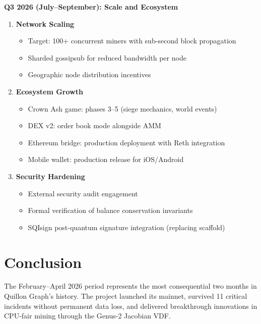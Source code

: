 \documentclass[12pt,a4paper]{article}
\begin{document}
\begin{futurebox}
\textbf{Q3 2026 (July--September): Scale and Ecosystem}

\begin{enumerate}
    \item \textbf{Network Scaling}
    \begin{itemize}
        \item Target: 100+ concurrent miners with sub-second block propagation
        \item Sharded gossipsub for reduced bandwidth per node
        \item Geographic node distribution incentives
    \end{itemize}

    \item \textbf{Ecosystem Growth}
    \begin{itemize}
        \item Crown Ash game: phases 3--5 (siege mechanics, world events)
        \item DEX v2: order book mode alongside AMM
        \item Ethereum bridge: production deployment with Reth integration
        \item Mobile wallet: production release for iOS/Android
    \end{itemize}

    \item \textbf{Security Hardening}
    \begin{itemize}
        \item External security audit engagement
        \item Formal verification of balance conservation invariants
        \item SQIsign post-quantum signature integration (replacing scaffold)
    \end{itemize}
\end{enumerate}
\end{futurebox}

\section{Conclusion}

The February--April 2026 period represents the most consequential two months in Quillon Graph's history. The project launched its mainnet, survived 11 critical incidents without permanent data loss, and delivered breakthrough innovations in CPU-fair mining through the Genus-2 Jacobian VDF.
\end{document}
